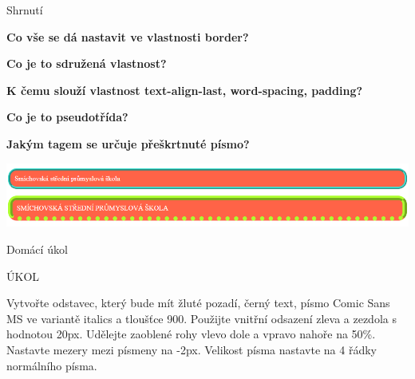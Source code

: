 \documentclass[aspectratio=1610]{beamer}
\begin{document}
\begin{frame}{Shrnutí}
    \begin{cardTiny}
        \begin{center}
            \textbf{Co vše se dá nastavit ve vlastnosti border?}
        \end{center}
    \end{cardTiny}
    \begin{cardTiny}
        \begin{center}
            \textbf{Co je to sdružená vlastnost?}
        \end{center}
    \end{cardTiny}
    \begin{cardTiny}
        \begin{center}
            \textbf{K čemu slouží vlastnost text-align-last, word-spacing, padding?}
        \end{center}
    \end{cardTiny}
    \begin{cardTiny}
        \begin{center}
            \textbf{Co je to pseudotřída?}
        \end{center}
    \end{cardTiny}
    \begin{cardTiny}
        \begin{center}
            \textbf{Jakým tagem se určuje přeškrtnuté písmo?}
        \end{center}
    \end{cardTiny}
\end{frame}

\begin{frame}
    \begin{center}
        \includegraphics[width=\textwidth]{img/9-10-ukol-pseudotridy.png}
    \end{center}
\end{frame}

\begin{frame}{Domácí úkol}
    \begin{cardTiny}
        \begin{center}
            ÚKOL
        \end{center}
        \begin{flushleft}
            Vytvořte odstavec, který bude mít žluté pozadí, černý text, písmo Comic Sans MS ve variantě italics a tloušťce 900. Použijte vnitřní odsazení zleva a zezdola s hodnotou 20px. Udělejte zaoblené rohy vlevo dole a vpravo nahoře na 50\%. Nastavte mezery mezi písmeny na -2px. Velikost písma nastavte na 4 řádky normálního písma.
        \end{flushleft}
    \end{cardTiny}
\end{frame}
\end{document}
